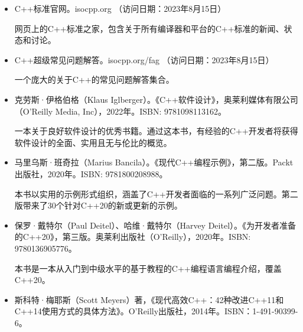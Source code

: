 \begin{itemize}
\item
C++标准官网。isocpp.org （访问日期：2023年8月15日）

\hspace*{\fill}

网页上的C++标准之家，包含关于所有编译器和平台的C++标准的新闻、状态和讨论。

\hspace*{\fill}

\item
C++超级常见问题解答。isocpp.org/fag （访问日期：2023年8月15日）

\hspace*{\fill}

一个庞大的关于C++的常见问题解答集合。

\hspace*{\fill}

\item
克劳斯·伊格伯格（Klaus Iglberger）。《C++软件设计》，奥莱利媒体有限公司（O’Reilly Media, Inc），2022年。ISBN: 9781098113162。

\hspace*{\fill}

一本关于良好软件设计的优秀书籍。通过这本书，有经验的C++开发者将获得软件设计的全面、实用且无与伦比的概览。

\hspace*{\fill}

\item
马里乌斯·班奇拉（Marius Bancila）。《现代C++编程示例》，第二版。Packt出版社，2020年。ISBN: 9781800208988。

\hspace*{\fill}

本书以实用的示例形式组织，涵盖了C++开发者面临的一系列广泛问题。第二版带来了30个针对C++20的新或更新的示例。

\hspace*{\fill}

\item
保罗·戴特尔（Paul Deitel）、哈维·戴特尔（Harvey Deitel）。《为开发者准备的C++20》，第三版。奥莱利出版社（O’Reilly），2020年。ISBN: 9780136905776。

\hspace*{\fill}

本书是一本从入门到中级水平的基于教程的C++编程语言编程介绍，覆盖C++20。

\hspace*{\fill}

\item
斯科特·梅耶斯（Scott Meyers）著，《现代高效C++：42种改进C++11和C++14使用方式的具体方法》。O'Reilly出版社，2014年。ISBN：1-491-90399-6。


\end{itemize}
